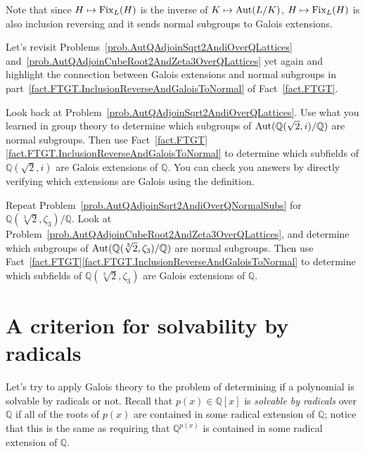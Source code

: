 Note that since $H\mapsto \operatorname{Fix}_L(H)$ is the inverse of $K\mapsto \operatorname{Aut}(L/K)$, $H\mapsto \operatorname{Fix}_L(H)$ is also inclusion reversing and it sends normal subgroups to Galois extensions. 

Let's revisit Problems~\ref{prob.AutQAdjoinSqrt2AndiOverQLattices} and~\ref{prob.AutQAdjoinCubeRoot2AndZeta3OverQLattices} yet again and highlight the connection between Galois extensions and normal subgroups  in part~\ref{fact.FTGT.InclusionReverseAndGaloisToNormal} of Fact~\ref{fact.FTGT}. 

\begin{problem}\label{prob.AutQAdjoinSqrt2AndiOverQNormalSubs}
Look back at Problem~\ref{prob.AutQAdjoinSqrt2AndiOverQLattices}. Use what you learned in group theory to determine which subgroups of $\operatorname{Aut}(\mathbb{Q}(\sqrt{2},i)/\mathbb{Q})$ are normal subgroups. Then use Fact~\ref{fact.FTGT}\ref{fact.FTGT.InclusionReverseAndGaloisToNormal} to determine which subfields of $\mathbb{Q}(\sqrt{2},i)$ are Galois extensions of $\mathbb{Q}$. You can check you answers by directly verifying which extensions are Galois using the definition.
\end{problem}

\begin{problem}
Repeat Problem~\ref{prob.AutQAdjoinSqrt2AndiOverQNormalSubs} for $\mathbb{Q}(\sqrt[3]{2},\zeta_3)/\mathbb{Q}$. Look  at Problem~\ref{prob.AutQAdjoinCubeRoot2AndZeta3OverQLattices}, and determine which subgroups of $\operatorname{Aut}(\mathbb{Q}(\sqrt[3]{2},\zeta_3)/\mathbb{Q})$ are normal subgroups. Then use Fact~\ref{fact.FTGT}\ref{fact.FTGT.InclusionReverseAndGaloisToNormal} to determine which subfields of $\mathbb{Q}(\sqrt[3]{2},\zeta_3)$ are Galois extensions of $\mathbb{Q}$.
\end{problem}

\section{A criterion for solvability by radicals}

Let's try to apply Galois theory to the problem of determining if a polynomial is solvable by radicals or not. Recall that $p(x)\in \mathbb{Q}[x]$ is \emph{solvable by radicals} over $\mathbb{Q}$ if all of the roots of $p(x)$ are contained in some radical extension of $\mathbb{Q}$; notice that this is the same as requiring that $\mathbb{Q}^{p(x)}$ is contained in some radical extension of $\mathbb{Q}$. 

